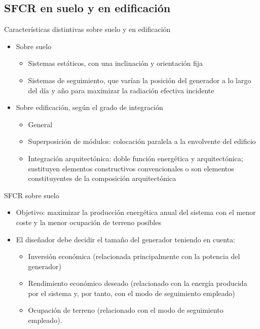 \documentclass[xcolor={usenames,svgnames,dvipsnames}]{beamer}
\begin{document}
\subsection{SFCR en suelo y en edificación}
\label{sec:orgfc9f6fa}
\begin{frame}[label={sec:orgae65a76}]{Características distintivas sobre suelo y en edificación}
\begin{itemize}
\item \alert{Sobre suelo}

\begin{itemize}
\item Sistemas estáticos, con una inclinación y orientación fija

\item Sistemas de seguimiento, que varían la posición del generador a lo
largo del día y año para maximizar la radiación efectiva incidente
\end{itemize}

\item \alert{Sobre edificación}, según el grado de integración

\begin{itemize}
\item General

\item Superposición de módulos: colocación paralela a la envolvente del
edificio

\item Integración arquitectónica: doble función energética y
arquitectónica; sustituyen elementos constructivos convencionales
o son elementos constituyentes de la composición arquitectónica
\end{itemize}
\end{itemize}
\end{frame}


\begin{frame}[label={sec:org1bdc7cb}]{SFCR sobre suelo}
\begin{itemize}
\item \alert{Objetivo}: maximizar la producción energética anual del sistema con
el menor coste y la menor ocupación de terreno posibles

\item El diseñador debe decidir el tamaño del generador teniendo en cuenta:

\begin{itemize}
\item Inversión económica (relacionada principalmente con la potencia
del generador)

\item Rendimiento económico deseado (relacionado con la energía
producida por el sistema y, por tanto, con el modo de seguimiento
empleado)

\item Ocupación de terreno (relacionado con el modo de seguimiento
empleado).
\end{itemize}
\end{itemize}
\end{frame}
\end{document}
